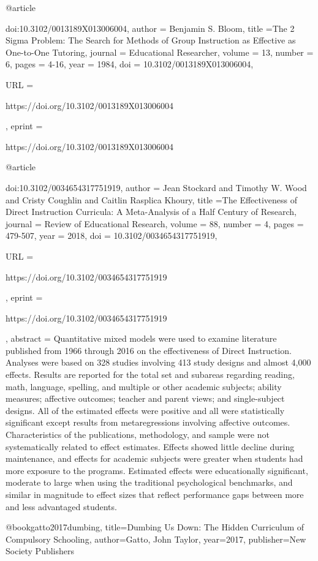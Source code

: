
@article{doi:10.3102/0013189X013006004,
author = {Benjamin S. Bloom},
title ={The 2 Sigma Problem: The Search for Methods of Group Instruction as Effective as One-to-One Tutoring},
journal = {Educational Researcher},
volume = {13},
number = {6},
pages = {4-16},
year = {1984},
doi = {10.3102/0013189X013006004},

URL = { 
        https://doi.org/10.3102/0013189X013006004
    
},
eprint = { 
        https://doi.org/10.3102/0013189X013006004
    
}

}

@article{doi:10.3102/0034654317751919,
author = {Jean Stockard and Timothy W. Wood and Cristy Coughlin and Caitlin Rasplica Khoury},
title ={The Effectiveness of Direct Instruction Curricula: A Meta-Analysis of a Half Century of Research},
journal = {Review of Educational Research},
volume = {88},
number = {4},
pages = {479-507},
year = {2018},
doi = {10.3102/0034654317751919},

URL = { 
        https://doi.org/10.3102/0034654317751919
    
},
eprint = { 
        https://doi.org/10.3102/0034654317751919
    
}
,
    abstract = { Quantitative mixed models were used to examine literature published from 1966 through 2016 on the effectiveness of Direct Instruction. Analyses were based on 328 studies involving 413 study designs and almost 4,000 effects. Results are reported for the total set and subareas regarding reading, math, language, spelling, and multiple or other academic subjects; ability measures; affective outcomes; teacher and parent views; and single-subject designs. All of the estimated effects were positive and all were statistically significant except results from metaregressions involving affective outcomes. Characteristics of the publications, methodology, and sample were not systematically related to effect estimates. Effects showed little decline during maintenance, and effects for academic subjects were greater when students had more exposure to the programs. Estimated effects were educationally significant, moderate to large when using the traditional psychological benchmarks, and similar in magnitude to effect sizes that reflect performance gaps between more and less advantaged students. }
}

@book{gatto2017dumbing,
  title={Dumbing Us Down: The Hidden Curriculum of Compulsory Schooling},
  author={Gatto, John Taylor},
  year={2017},
  publisher={New Society Publishers}
}

